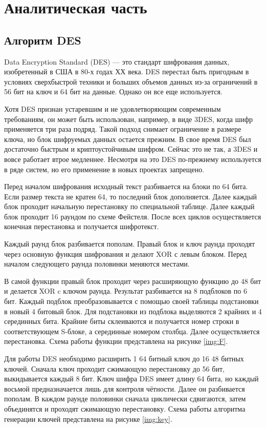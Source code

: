\chapter{Аналитическая часть}

\section{Алгоритм DES}

Data Encryption Standard (DES) --- это стандарт шифрования данных, изобретенный в США в 80-х годах ХХ века. DES перестал быть пригодным в условиях сверхбыстрой техники и больших объемов данных из-за ограничений в 56 бит на ключ и 64 бит на данные. Однако он все еще используется.

Хотя DES признан устаревшим и не удовлетворяющим современным требованиям, он может быть использован, например, в виде 3DES, когда шифр применяется три раза подряд. Такой подход снимает ограничение в размере ключа, но блок шифруемых данных остается прежним. В свое время DES был достаточно быстрым и криптоустойчивым шифром. Сейчас это не так, а 3DES и вовсе работает втрое медленнее. Несмотря на это DES по-прежнему используется в ряде систем, но его применение в новых проектах запрещено. 

Перед началом шифрования исходный текст разбивается на блоки по 64 бита. Если размер текста не кратен 64, то последний блок дополняется. Далее каждый блок проходит начальную перестановку по специальной таблице. Далее каждый блок проходит 16 раундом по схеме Фейстеля. После всех циклов осуществляется конечная перестановка и получается шифротекст. 

Каждый раунд блок разбивается пополам. Правый блок и ключ раунда проходят через основную функция шифрования и делают XOR с левым блоком. Перед началом следующего раунда половинки меняются местами.
 
В самой функции правый блок проходит через расширяющую функцию до 48 бит и делается XOR c ключом раунда. Результат разбивается на 8 подблоков по 6 бит. Каждый подблок преобразовывается с помощью своей таблицы подстановки в новый 4 битовый блок. Для подстановки из подблока выделяются 2 крайних и 4 серединных бита. Крайние биты склеиваются и получается номер строки в соответствующем S-блоке, а серединные номером столбца. Далее осуществляется перестановка. Схема работы функции представлена на рисунке \ref{img:F}.

\FloatBarrier

Для работы DES необходимо расширить 1 64 битный ключ до 16 48 битных ключей. Сначала ключ проходит сжимающую перестановку до 56 бит, выкидывается каждый 8 бит. Ключ шифра DES имеет длину 64 бита, но каждый восьмой предназначается лишь для контроля чётности. Далее он разбивается пополам. В каждом раунде половинки сначала циклически сдвигаются, затем объединятся и проходят сжимающую перестановку. Схема работы алгоритма генерации ключей представлена на рисунке \ref{img:key}.

